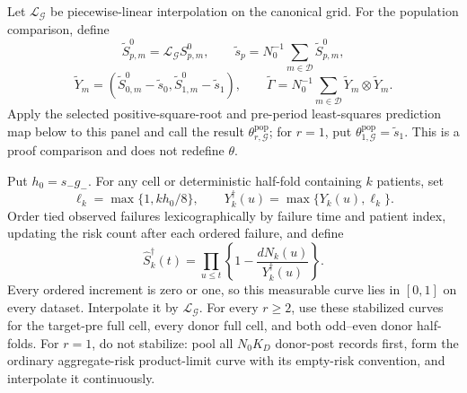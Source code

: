 Let \(\mathcal L_{\mathcal G}\) be piecewise-linear interpolation on the canonical grid. For the population comparison, define
\[
 \widetilde S^0_{p,m}=\mathcal L_{\mathcal G}S^0_{p,m},\qquad
 \widetilde s_p=N_0^{-1}\sum_{m\in\mathcal D}\widetilde S^0_{p,m},
\]
\[
 \widetilde Y_m=(\widetilde S^0_{0,m}-\widetilde s_0,
                  \widetilde S^0_{1,m}-\widetilde s_1),\qquad
 \widetilde\Gamma=N_0^{-1}\sum_{m\in\mathcal D}
 \widetilde Y_m\otimes\widetilde Y_m.
\]
Apply the selected positive-square-root and pre-period least-squares prediction map below to this panel and call the result \(\theta^{\mathrm{pop}}_{r,\mathcal G}\); for \(r=1\), put \(\theta^{\mathrm{pop}}_{1,\mathcal G}=\widetilde s_1\). This is a proof comparison and does not redefine \(\theta\).

Put \(h_0=s_-g_-\). For any cell or deterministic half-fold containing \(k\) patients, set
\[
 \ell_k=\max\{1,kh_0/8\},\qquad
 Y_k^\dagger(u)=\max\{Y_k(u),\ell_k\}.
\]
Order tied observed failures lexicographically by failure time and patient index, updating the risk count after each ordered failure, and define
\[
 \widehat S_k^\dagger(t)=
 \prod_{u\le t}\left\{1-\frac{dN_k(u)}{Y_k^\dagger(u)}\right\}.
\]
Every ordered increment is zero or one, so this measurable curve lies in \([0,1]\) on every dataset. Interpolate it by \(\mathcal L_{\mathcal G}\). For every \(r\ge2\), use these stabilized curves for the target-pre full cell, every donor full cell, and both odd--even donor half-folds. For \(r=1\), do not stabilize: pool all \(N_0K_D\) donor-post records first, form the ordinary aggregate-risk product-limit curve with its empty-risk convention, and interpolate it continuously.

